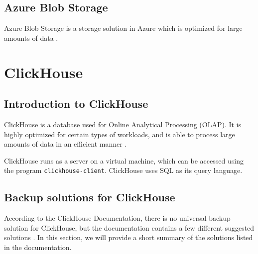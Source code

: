\subsection{Azure Blob Storage} \label{theory:blobs}

Azure Blob Storage is a storage solution in Azure which is optimized for large amounts of data \cite{tamram_introduction_nodate}. 


\section{ClickHouse} \label{Clickhouse}

\subsection{Introduction to ClickHouse}

ClickHouse is a database used for Online Analytical Processing (OLAP).
It is highly optimized for certain types of workloads,
and is able to process large amounts of data in an efficient manner \cite{noauthor_what_nodate-2}.

ClickHouse runs as a server on a virtual machine,
which can be accessed using the program \texttt{clickhouse-client}.
ClickHouse uses SQL as its query language.

\subsection{Backup solutions for ClickHouse} \label{theory:ch-solutions}

According to the ClickHouse Documentation, there is no universal backup solution for ClickHouse,
but the documentation contains a few different suggested solutions \cite{noauthor_data_nodate}.
In this section, we will provide a short summary of the solutions listed in the documentation.

